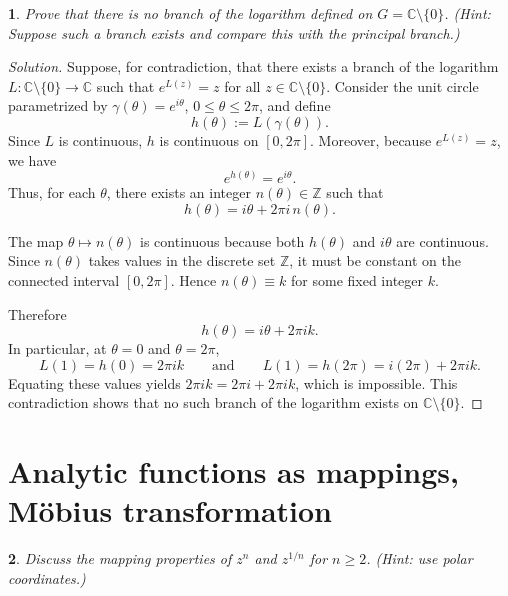 \documentclass[12pt, a4paper]{report}
\theoremstyle{spaced}
\newtheorem{exercise}{}
\newcommand{\setexercise}[1]{\setcounter{exercise}{#1-1}}
\begin{document}
\setexercise{21}
\begin{exercise}
	Prove that there is no branch of the logarithm defined on \(G=\mathbb{C}\setminus\{0\}\).
	\emph{(Hint: Suppose such a branch exists and compare this with the principal branch.)}
\end{exercise}

\begin{proof}[Solution]
	Suppose, for contradiction, that there exists a branch of the logarithm
	\(L : \mathbb{C}\setminus\{0\}\to \mathbb{C}\) such that \(e^{L(z)}=z\) for all
	\(z\in\mathbb{C}\setminus\{0\}\).
	Consider the unit circle parametrized by \(\gamma(\theta)=e^{i\theta}\),
	\(0 \le \theta \le 2\pi\), and define
	\[
		h(\theta) := L(\gamma(\theta)).
	\]
	Since \(L\) is continuous, \(h\) is continuous on \([0,2\pi]\).
	Moreover, because \(e^{L(z)}=z\), we have
	\[
		e^{h(\theta)} = e^{i\theta}.
	\]
	Thus, for each \(\theta\), there exists an integer \(n(\theta)\in\mathbb{Z}\)
	such that
	\[
		h(\theta) = i\theta + 2\pi i\, n(\theta).
	\]

	The map \(\theta \mapsto n(\theta)\) is continuous because both \(h(\theta)\)
	and \(i\theta\) are continuous. Since \(n(\theta)\) takes values in the
	discrete set \(\mathbb{Z}\), it must be constant on the connected interval
	\([0,2\pi]\). Hence \(n(\theta) \equiv k\) for some fixed integer \(k\).

	Therefore
	\[
		h(\theta) = i\theta + 2\pi i k.
	\]
	In particular, at \(\theta = 0\) and \(\theta = 2\pi\),
	\[
		L(1) = h(0) = 2\pi i k
		\qquad\text{and}\qquad
		L(1) = h(2\pi) = i(2\pi) + 2\pi i k.
	\]
	Equating these values yields \(2\pi i k = 2\pi i + 2\pi i k\), which is
	impossible. This contradiction shows that no such branch of the logarithm
	exists on \(\mathbb{C}\setminus\{0\}\).
\end{proof}

\section{Analytic functions as mappings, Möbius transformation}
\setexercise{4}
\begin{exercise}
	Discuss the mapping properties of \(z^{n}\) and \(z^{1/n}\) for \(n\ge 2\). \emph{(Hint: use polar coordinates.)}
\end{exercise}
\end{document}
